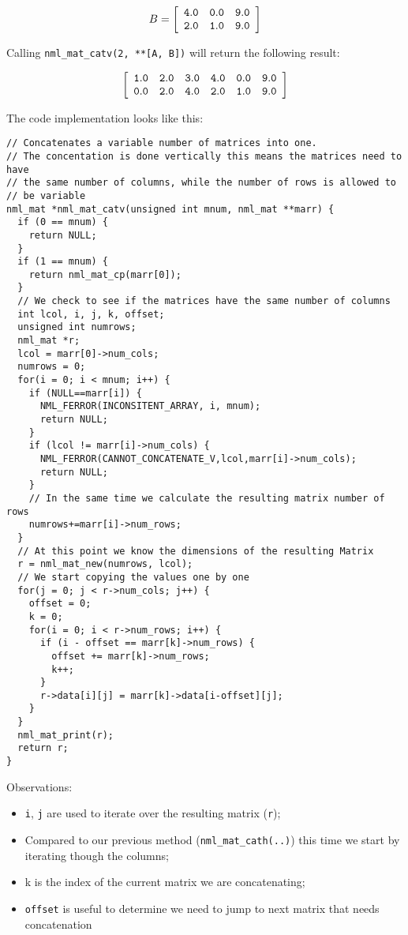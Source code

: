 $$
B = \left[
\begin{array}{rrr}
\tt 4.0 & \tt 0.0 & \tt 9.0 \\
\tt 2.0 & \tt 1.0 & \tt 9.0
\end{array}
\right]
$$

Calling {\tt nml\_mat\_catv(2, **[A, B])} will return the following result:

$$
\left[
\begin{array}{rrrrrr}
\tt 1.0 & \tt 2.0 & \tt 3.0 & \tt 4.0 & \tt 0.0 & \tt 9.0 \\
\tt 0.0 & \tt 2.0 & \tt 4.0 & \tt 2.0 & \tt 1.0 & \tt 9.0
\end{array}
\right]
$$

The code implementation looks like this:

\begin{verbatim}
// Concatenates a variable number of matrices into one.
// The concentation is done vertically this means the matrices need to have
// the same number of columns, while the number of rows is allowed to
// be variable
nml_mat *nml_mat_catv(unsigned int mnum, nml_mat **marr) {
  if (0 == mnum) {
    return NULL;
  }
  if (1 == mnum) {
    return nml_mat_cp(marr[0]);
  }
  // We check to see if the matrices have the same number of columns
  int lcol, i, j, k, offset;
  unsigned int numrows;
  nml_mat *r;
  lcol = marr[0]->num_cols;
  numrows = 0;
  for(i = 0; i < mnum; i++) {
    if (NULL==marr[i]) {
      NML_FERROR(INCONSITENT_ARRAY, i, mnum);
      return NULL;
    }
    if (lcol != marr[i]->num_cols) {
      NML_FERROR(CANNOT_CONCATENATE_V,lcol,marr[i]->num_cols);
      return NULL;
    }
    // In the same time we calculate the resulting matrix number of rows
    numrows+=marr[i]->num_rows;
  }
  // At this point we know the dimensions of the resulting Matrix
  r = nml_mat_new(numrows, lcol);
  // We start copying the values one by one
  for(j = 0; j < r->num_cols; j++) {
    offset = 0;
    k = 0;
    for(i = 0; i < r->num_rows; i++) {
      if (i - offset == marr[k]->num_rows) {
        offset += marr[k]->num_rows;
        k++;
      }
      r->data[i][j] = marr[k]->data[i-offset][j];
    }
  }
  nml_mat_print(r);
  return r;
}
\end{verbatim}

Observations:

\begin{itemize}
\item {\tt i}, {\tt j} are used to iterate over the resulting matrix ({\tt r});
\item Compared to our previous method ({\tt nml\_mat\_cath(..)}) this time we start by iterating though the columns;
\item k is the index of the current matrix we are concatenating;
\item {\tt offset} is useful to determine we need to jump to next matrix that needs concatenation
\end{itemize}

